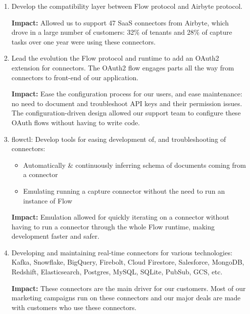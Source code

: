 \documentclass[10pt,a4paper]{article}
\begin{document}
\begin{enumerate}
\item{Develop the compatibility layer between Flow protocol and Airbyte protocol.

{\iffalse Airbyte connectors are docker images which communicate with their runtime over stdio, however Flow protocol communicates over TCP (to allow for compatibility with Firecracker and other VMs). This layer allowed our connector support team to modify behaviour of airbyte connectors using configuration files, which allowed them to adapt these connectors to our platform using configuration, and without the need to code.\fi}

\textbf{Impact:} Allowed us to support 47 SaaS connectors from Airbyte, which drove in a large number of customers: 32\% of tenants and 28\% of capture tasks over one year were using these connectors.}

\item{Lead the evolution the Flow protocol and runtime to add an OAuth2 extension for connectors. The OAuth2 flow engages parts all the way from connectors to front-end of our application.

\textbf{Impact:} Ease the configuration process for our users, and ease maintenance: no need to document and troubleshoot API keys and their permission issues. The configuration-driven design allowed our support team to configure these OAuth flows without having to write code.}

\item{flowctl: Develop tools for easing development of, and troubleshooting of connectors:
\begin{itemize}
\item{Automatically \& continuously inferring schema of documents coming from a connector}
\item{Emulating running a capture connector without the need to run an instance of Flow}
\end{itemize}}

\textbf{Impact:} Emulation allowed for quickly iterating on a connector without having to run a connector through the whole Flow runtime, making development faster and safer.

\item{Developing and maintaining real-time connectors for various technologies: Kafka, Snowflake, BigQuery, Firebolt, Cloud Firestore, Salesforce, MongoDB, Redshift, Elasticsearch, Postgres, MySQL, SQLite, PubSub, GCS, etc.}

\textbf{Impact:} These connectors are the main driver for our customers. Most of our marketing campaigns run on these connectors and our major deals are made with customers who use these connectors.

\end{enumerate}
	 
\end{document}
